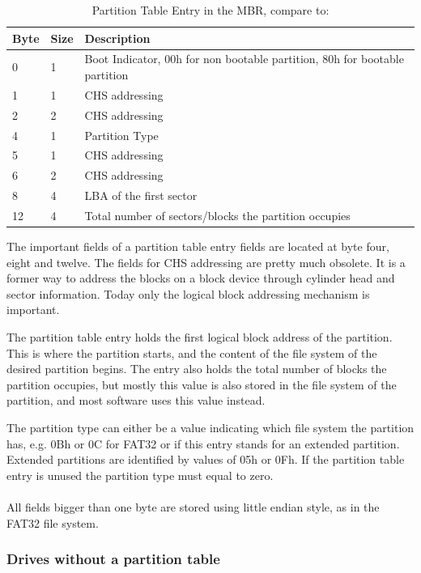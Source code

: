 \begin{table}[ht]
\caption{Partition Table Entry in the MBR, compare to: \cite{usb_ms_jan}}
\centering
\begin{tabular}{|l|l|l|}
\hline\hline
\textbf{Byte} & \textbf{Size} & \textbf{Description}\\ \hline
0 & 1 & Boot Indicator, 00h for non bootable partition, 80h for bootable partition \\ \hline
1 & 1 & CHS addressing \\ \hline
2 & 2 & CHS addressing \\ \hline
4 & 1 & Partition Type \\ \hline
5 & 1 & CHS addressing \\ \hline
6 & 2 & CHS addressing \\ \hline
8 & 4 & LBA of the first sector \\ \hline
12 & 4 & Total number of sectors/blocks the partition occupies \\ \hline
\end{tabular}
\label{table:mbr_entry}
\end{table}

The important fields of a partition table entry fields are located at byte four, eight and twelve. The fields for CHS addressing are pretty much obsolete. It is a former way to address the blocks on a block device through cylinder head and sector information. Today only the logical block addressing mechanism is important.

The partition table entry holds the first logical block address of the partition. This is where the partition starts, and the content of the file system of the desired partition begins. The entry also holds the total number of blocks the partition occupies, but mostly this value is also stored in the file system of the partition, and most software uses this value instead\cite{usb_ms_jan}.

The partition type can either be a value indicating which file system the partition has, e.g. 0Bh or 0C for FAT32 or if this entry stands for an extended partition. Extended partitions are identified by values of 05h or 0Fh. If the partition table entry is unused the partition type must equal to zero\cite{usb_ms_jan}.
\\\\
All fields bigger than one byte are stored using little endian style, as in the FAT32 file system.

\subsubsection{Drives without a partition table}

